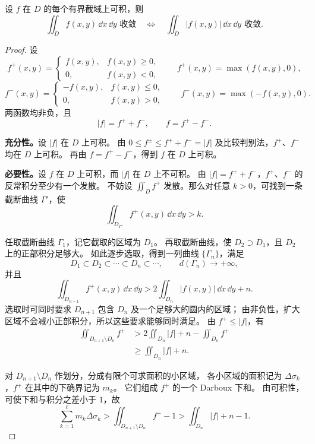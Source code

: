 \begin{theorem}[收敛与绝对收敛]\label{p2-improper-absolute}
设 $f$ 在 $D$ 的每个有界截域上可积，则
\[
\displaystyle\iint_Df(x,y)\,\dd x\,\dd y\text{ 收敛}
\quad\Longleftrightarrow\quad
\displaystyle\iint_D|f(x,y)|\,\dd x\,\dd y\text{ 收敛}.
\]
\end{theorem}
\begin{proof}
设
\[
f^+(x,y)=\begin{cases}f(x,y),&f(x,y)\ge0,\\0,&f(x,y)<0,\end{cases}
\qquad f^+(x,y)=\max(f(x,y),0),
\]
\[
f^-(x,y)=\begin{cases}-f(x,y),&f(x,y)\le0,\\0,&f(x,y)>0,\end{cases}
\qquad f^-(x,y)=\max(-f(x,y),0).
\]
两函数均非负，且
\[
|f|=f^++f^-,\qquad f=f^+-f^-.
\]

\textbf{充分性。}设 $|f|$ 在 $D$ 上可积。
由 $0\le f^\pm\le f^++f^-=|f|$ 及比较判别法，$f^+$、$f^-$ 均在 $D$ 上可积。
再由 $f=f^+-f^-$，得到 $f$ 在 $D$ 上可积。

\textbf{必要性。}设 $f$ 在 $D$ 上可积，而 $|f|$ 在 $D$ 上不可积。
由 $|f|=f^++f^-$，$f^+$、$f^-$ 的反常积分至少有一个发散。
不妨设 $\displaystyle\iint_Df^+$ 发散。那么对任意 $k>0$，可找到一条截断曲线 $\Gamma'$，使
\[
\displaystyle\iint_{D_{\Gamma'}}f^+(x,y)\,\dd x\,\dd y>k.
\]

任取截断曲线 $\Gamma_1$，记它截取的区域为 $D_1$。
再取截断曲线，使 $D_2\supset D_1$，且 $D_2$ 上的正部积分足够大。
如此逐步选取，得到一列曲线 $\{\Gamma_n\}$，满足
\[
D_1\subset D_2\subset\cdots\subset D_n\subset\cdots,\qquad
d(\Gamma_n)\longrightarrow+\infty,
\]
并且
\[
\displaystyle\iint_{D_{n+1}}f^+(x,y)\,\dd x\,\dd y
>2\displaystyle\iint_{D_n}|f(x,y)|\,\dd x\,\dd y+n.
\]
选取时可同时要求 $D_{n+1}$ 包含 $D_n$ 及一个足够大的圆内的区域；
由非负性，扩大区域不会减小正部积分，所以这些要求能够同时满足。
由 $f^+\le|f|$，有
\begin{align*}
\displaystyle\iint_{D_{n+1}\setminus D_n}f^+
&>2\displaystyle\iint_{D_n}|f|+n-\displaystyle\iint_{D_n}f^+\\
&\ge\displaystyle\iint_{D_n}|f|+n.
\end{align*}

对 $D_{n+1}\setminus D_n$ 作划分，分成有限个可求面积的小区域，
各小区域的面积记为 $\Delta\sigma_k$，$f^+$ 在其中的下确界记为 $m_k$。
它们组成 $f^+$ 的一个 Darboux 下和。
由可积性，可使下和与积分之差小于 $1$，故
\[
\sum_{k=1}^{\ell}m_k\Delta\sigma_k
>\displaystyle\iint_{D_{n+1}\setminus D_n}f^+-1
>\displaystyle\iint_{D_n}|f|+n-1.
\]


\end{proof}
